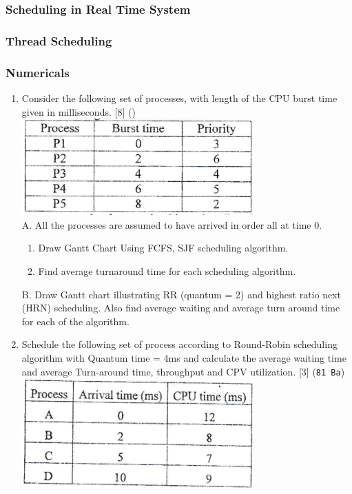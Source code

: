 \documentclass[12pt]{article}
\begin{document}
\subsubsection{Scheduling in Real Time System}
\subsubsection{Thread Scheduling}
\subsubsection{Numericals}
\begin{enumerate}
	\item Consider the following set of processes, with length of the CPU burst time given in milliseconds. \hfill [8] ()\\
	\includegraphics[width=3.5in]{os_1}\\
	A. All the processes are assumed to have arrived in order all at time 0.
	\begin{enumerate}[noitemsep, topsep = 0pt, label = \alph*.]
		\item Draw Gantt Chart Using FCFS, SJF scheduling algorithm.
		\item Find average turnaround time for each scheduling algorithm.
	\end{enumerate}
	B. Draw Gantt chart illustrating RR (quantum = 2) and highest ratio next (HRN) scheduling. Also find average waiting and average turn around time for each of the algorithm.
	
	\item Schedule the following set of process according to Round-Robin scheduling algorithm with Quantum time = 4ms and calculate the average waiting time and average Turn-around time, throughput and CPV utilization. \hfill [3] (\texttt{81 Ba})\\
	\includegraphics[width=3.5in]{os_2}
	

\end{enumerate}
\end{document}
